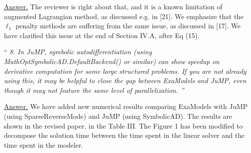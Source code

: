 \documentclass[10pt,a4paper]{article}
\newenvironment{quotereviewer}{\vspace{.5cm}{\underline\reviewername} ``\it\footnotesize}{''}
\newcommand{\answer}{\vspace{1mm}\underline{Answer.} }
\begin{document}
\answer
The reviewer is right about that, and it is a known limitation of augmented Lagrangian
method, as discussed e.g. in [21]. We emphasize that the $\ell_1$ penalty methods
are suffering from the same issue, as discussed in [17]. We have clarified this issue
at the end of Section IV.A, after Eq (15).

\begin{quotereviewer}
8. In JuMP, symbolic autodifferentiation (using MathOptSymbolicAD.DefaultBackend() or similar) can show speedup on derivative computation for some large structured problems. If you are not already using this, it may be helpful to close the gap between ExaModels and JuMP, even though it may not feature the same level of parallelization.
\end{quotereviewer}

\answer
We have added new numerical results comparing ExaModels with
JuMP (using SparseReverseMode) and JuMP (using SymbolicAD). The results are
shown in the revised paper, in the Table III. The Figure 1 has been modified
to decompose the solution time between the time spent in the linear solver
and the time spent in the modeler.
\end{document}
